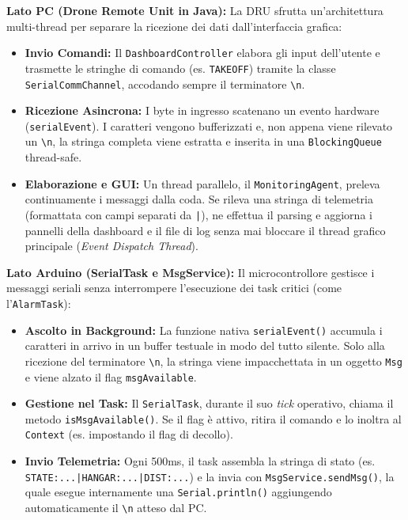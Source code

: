 \documentclass[12pt, a4paper]{article}
\begin{document}
\textbf{Lato PC (Drone Remote Unit in Java):}
La DRU sfrutta un'architettura multi-thread per separare la ricezione dei dati dall'interfaccia grafica:
\begin{itemize}
    \item \textbf{Invio Comandi:} Il \texttt{DashboardController} elabora gli input dell'utente e trasmette le stringhe di comando (es. \texttt{TAKEOFF}) tramite la classe \texttt{SerialCommChannel}, accodando sempre il terminatore \texttt{\textbackslash n}.
    \item \textbf{Ricezione Asincrona:} I byte in ingresso scatenano un evento hardware (\texttt{serialEvent}). I caratteri vengono bufferizzati e, non appena viene rilevato un \texttt{\textbackslash n}, la stringa completa viene estratta e inserita in una \texttt{BlockingQueue} thread-safe.
    \item \textbf{Elaborazione e GUI:} Un thread parallelo, il \texttt{MonitoringAgent}, preleva continuamente i messaggi dalla coda. Se rileva una stringa di telemetria (formattata con campi separati da \texttt{|}), ne effettua il parsing e aggiorna i pannelli della dashboard e il file di log senza mai bloccare il thread grafico principale (\textit{Event Dispatch Thread}).
\end{itemize}

\textbf{Lato Arduino (SerialTask e MsgService):}
Il microcontrollore gestisce i messaggi seriali senza interrompere l'esecuzione dei task critici (come l'\texttt{AlarmTask}):
\begin{itemize}
    \item \textbf{Ascolto in Background:} La funzione nativa \texttt{serialEvent()} accumula i caratteri in arrivo in un buffer testuale in modo del tutto silente. Solo alla ricezione del terminatore \texttt{\textbackslash n}, la stringa viene impacchettata in un oggetto \texttt{Msg} e viene alzato il flag \texttt{msgAvailable}.
    \item \textbf{Gestione nel Task:} Il \texttt{SerialTask}, durante il suo \textit{tick} operativo, chiama il metodo \texttt{isMsgAvailable()}. Se il flag è attivo, ritira il comando e lo inoltra al \texttt{Context} (es. impostando il flag di decollo).
    \item \textbf{Invio Telemetria:} Ogni 500ms, il task assembla la stringa di stato (es. \texttt{STATE:...|HANGAR:...|DIST:...}) e la invia con \texttt{MsgService.sendMsg()}, la quale esegue internamente una \texttt{Serial.println()} aggiungendo automaticamente il \texttt{\textbackslash n} atteso dal PC.
\end{itemize}
\end{document}
